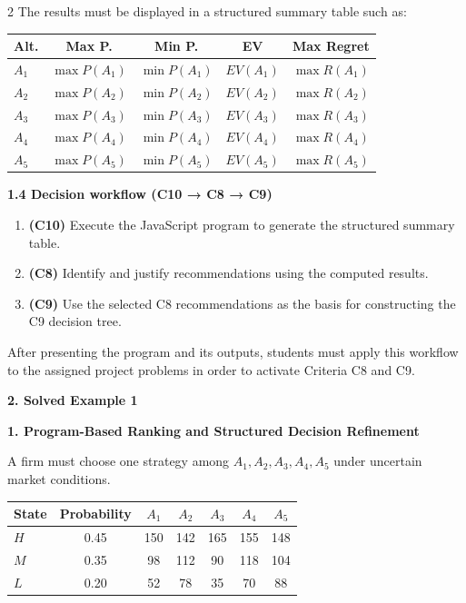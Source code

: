 \documentclass[12pt]{article}
\newcommand{\SubsectionBox}[1]{%
	\noindent\colorbox{gray!30}{%
		\parbox{\linewidth}{\textbf{#1}}%
	}\par\vspace{0.35cm}%
}
\begin{document}
\begin{multicols}{2}
		The results must be displayed in a structured summary table such as:
		\begin{center}
			\begin{tabular}{l c c c c}
				\hline
				Alt. & Max P. & Min P. & EV & Max Regret \\
				\hline
				$A_1$ & $\max P(A_1)$ & $\min P(A_1)$ & $EV(A_1)$ & $\max R(A_1)$ \\
				$A_2$ & $\max P(A_2)$ & $\min P(A_2)$ & $EV(A_2)$ & $\max R(A_2)$ \\
				$A_3$ & $\max P(A_3)$ & $\min P(A_3)$ & $EV(A_3)$ & $\max R(A_3)$ \\
				$A_4$ & $\max P(A_4)$ & $\min P(A_4)$ & $EV(A_4)$ & $\max R(A_4)$ \\
				$A_5$ & $\max P(A_5)$ & $\min P(A_5)$ & $EV(A_5)$ & $\max R(A_5)$ \\
				\hline
			\end{tabular}
		\end{center}
		
		\vspace{0.25cm}
		\textbf{1.4 Decision workflow (C10 → C8 → C9)}\par
		
		\begin{enumerate}
			\item \textbf{(C10)} Execute the JavaScript program to generate the structured summary table.
			\item \textbf{(C8)} Identify and justify recommendations using the computed results.
			\item \textbf{(C9)} Use the selected C8 recommendations as the basis for constructing the C9 decision tree.
		\end{enumerate}
		
		After presenting the program and its outputs, students must apply this workflow to the assigned project problems in order to activate Criteria C8 and C9.
		
		\vspace{0.25cm}
		\SubsectionBox{2. Solved Example 1}
		
		\textbf{1. Program-Based Ranking and Structured Decision Refinement}\par
		A firm must choose one strategy among $A_1,A_2,A_3,A_4,A_5$ under uncertain market conditions.

		\begin{center}
			\begin{tabular}{l  c c c c c c}
				\hline
				State & Probability & $A_1$ & $A_2$ & $A_3$ & $A_4$ & $A_5$ \\
				\hline
				$H$ & 0.45 & 150 & 142 & 165 & 155 & 148 \\
				$M$ & 0.35 & 98 & 112 & 90 & 118 & 104 \\
				$L$ & 0.20 & 52 & 78 & 35 & 70 & 88 \\
				\hline
			\end{tabular}
		\end{center}
		

\end{multicols}
\end{document}
